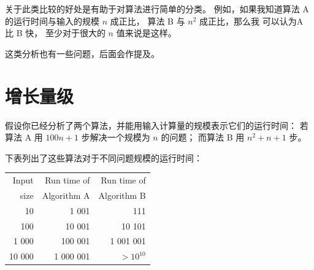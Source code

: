 
关于此类比较的好处是有助于对算法进行简单的分类。
例如，如果我知道算法 A 的运行时间与输入的规模 $n$ 成正比，
算法 B 与 $n^2$ 成正比，那么我 可以认为A 比 B 快， 至少对于很大的 $n$ 值来说是这样。


这类分析也有一些问题，后面会作提及。


\section{增长量级}


假设你已经分析了两个算法，并能用输入计算量的规模表示它们的运行时间：
若算法 A 用 $100n+1$ 步解决一个规模为 $n$ 的问题；
而算法 B 用 $n^2 + n + 1$ 步。
  


下表列出了这些算法对于不同问题规模的运行时间：

\begin{center}
\begin{tabular}{|r|r|r|}
\hline
Input     &   Run time of     & Run time of \\
size      &   Algorithm A     & Algorithm B \\
\hline
10        &   1 001           & 111         \\
100       &   10 001          & 10 101         \\
1 000     &   100 001         & 1 001 001         \\
10 000    &   1 000 001       & $> 10^{10}$         \\
\hline
\end{tabular}
\end{center}

